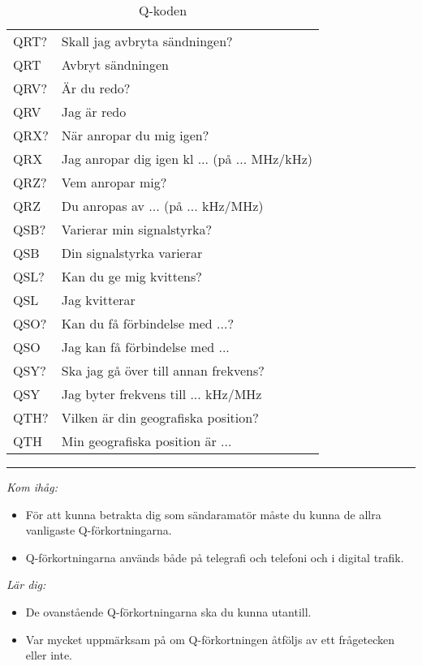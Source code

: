\begin{table}[h]
\begin{tabular}{ll}
    QRT? & Skall jag avbryta sändningen?\\
    QRT  & Avbryt sändningen \\ \hline

    QRV? & Är du redo?\\
    QRV  & Jag är redo\\ \hline

    QRX? & När anropar du mig igen?\\
    QRX  & Jag anropar dig igen kl ... (på ... MHz/kHz)\\ \hline

    QRZ? & Vem anropar mig?\\
    QRZ  & Du anropas av ... (på ... kHz/MHz)\\ \hline

    QSB? & Varierar min signalstyrka?\\
    QSB  & Din signalstyrka varierar\\ \hline

    QSL? & Kan du ge mig kvittens?\\
    QSL  & Jag kvitterar\\ \hline

    QSO? & Kan du få förbindelse med ...?\\
    QSO  & Jag kan få förbindelse med ...\\ \hline

    QSY? & Ska jag gå över till annan frekvens?\\
    QSY  & Jag byter frekvens till ... kHz/MHz\\ \hline

    QTH? & Vilken är din geografiska position?\\
    QTH  & Min geografiska position är ...\\ \hline
  \end{tabular}
  \caption{Q-koden}
  \label{tab:q-koden}
\end{table}
\normalsize

\vspace{1em} \hrule \vspace{1em}

\noindent\emph{Kom ihåg:}

\begin{itemize}
\item För att kunna betrakta dig som sändaramatör måste du kunna de allra
vanligaste Q-förkortningarna.

\item Q-förkortningarna används både på telegrafi och telefoni och i digital
trafik.
\end{itemize}

\noindent\emph{Lär dig:}

\begin{itemize}
\item De ovanstående Q-förkortningarna ska du kunna
utantill.

\item Var mycket uppmärksam på om Q-förkortningen åtföljs av ett
frågetecken eller inte.
\end{itemize}
